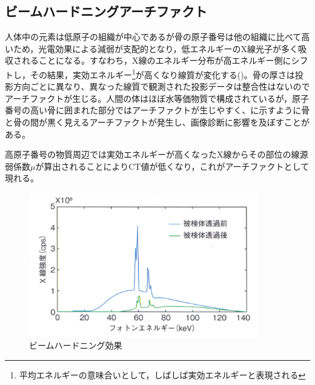 \subsection{ビームハードニングアーチファクト}
人体中の元素は低原子の組織が中心であるが骨の原子番号は他の組織に比べて高いため，光電効果による減弱が支配的となり，低エネルギーのX線光子が多く吸収されることになる。すなわち，X線のエネルギー分布が高エネルギー側にシフトし，その結果，実効エネルギー\footnote{平均エネルギーの意味合いとして，しばしば実効エネルギーと表現される}が高くなり線質が変化する()。骨の厚さは投影方向ごとに異なり、異なった線質で観測された投影データは整合性はないのでアーチファクトが生じる。人間の体はほぼ水等価物質で構成されているが，原子番号の高い骨に囲まれた部分ではアーチファクトが生じやすく、に示すように骨と骨の間が黒く見えるアーチファクトが発生し、画像診断に影響を及ぼすことがある。

高原子番号の物質周辺では実効エネルギーが高くなったX線からその部位の線源弱係数$\mu$が算出されることによりCT値が低くなり，これがアーチファクトとして現れる。
\fi

\begin{figure}[H]
 \begin{minipage}{1\hsize}
  \begin{center}
   \includegraphics[width=10cm]{image/other/beam_hard.eps}
  \end{center}
  \vspace{-0.9cm}\hspace{8cm}
  
 \end{minipage}
 \begin{center}
  \vspace{-1zh}
  \caption{ビームハードニング効果\cite{spectralCT}}
  \label{fig:beam_hard}
  \end{center}
\end{figure}

